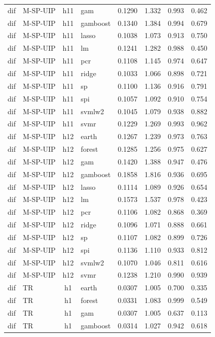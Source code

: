 \begin{ThreePartTable}
\begin{longtable}[t]{llclcccc}
dif & M-SP-UIP & h11 & gam & 0.1290 & 1.332 & 0.993 & 0.462\\
dif & M-SP-UIP & h11 & gamboost & 0.1340 & 1.384 & 0.994 & 0.679\\
dif & M-SP-UIP & h11 & lasso & 0.1038 & 1.073 & 0.913 & 0.750\\
dif & M-SP-UIP & h11 & lm & 0.1241 & 1.282 & 0.988 & 0.450\\
dif & M-SP-UIP & h11 & pcr & 0.1108 & 1.145 & 0.974 & 0.647\\
dif & M-SP-UIP & h11 & ridge & 0.1033 & 1.066 & 0.898 & 0.721\\
dif & M-SP-UIP & h11 & sp & 0.1100 & 1.136 & 0.916 & 0.791\\
dif & M-SP-UIP & h11 & spi & 0.1057 & 1.092 & 0.910 & 0.754\\
dif & M-SP-UIP & h11 & svmlw2 & 0.1045 & 1.079 & 0.938 & 0.882\\
dif & M-SP-UIP & h11 & svmr & 0.1229 & 1.269 & 0.993 & 0.962\\
\addlinespace
dif & M-SP-UIP & h12 & earth & 0.1267 & 1.239 & 0.973 & 0.763\\
dif & M-SP-UIP & h12 & forest & 0.1285 & 1.256 & 0.975 & 0.627\\
dif & M-SP-UIP & h12 & gam & 0.1420 & 1.388 & 0.947 & 0.476\\
dif & M-SP-UIP & h12 & gamboost & 0.1858 & 1.816 & 0.936 & 0.695\\
dif & M-SP-UIP & h12 & lasso & 0.1114 & 1.089 & 0.926 & 0.654\\
dif & M-SP-UIP & h12 & lm & 0.1573 & 1.537 & 0.978 & 0.423\\
dif & M-SP-UIP & h12 & pcr & 0.1106 & 1.082 & 0.868 & 0.369\\
dif & M-SP-UIP & h12 & ridge & 0.1096 & 1.071 & 0.888 & 0.661\\
dif & M-SP-UIP & h12 & sp & 0.1107 & 1.082 & 0.899 & 0.726\\
dif & M-SP-UIP & h12 & spi & 0.1136 & 1.110 & 0.933 & 0.812\\
dif & M-SP-UIP & h12 & svmlw2 & 0.1070 & 1.046 & 0.811 & 0.616\\
dif & M-SP-UIP & h12 & svmr & 0.1238 & 1.210 & 0.990 & 0.939\\
\addlinespace
dif & TR & h1 & earth & 0.0307 & 1.005 & 0.700 & 0.335\\
dif & TR & h1 & forest & 0.0331 & 1.083 & 0.999 & 0.549\\
dif & TR & h1 & gam & 0.0307 & 1.005 & 0.637 & 0.113\\
dif & TR & h1 & gamboost & 0.0314 & 1.027 & 0.942 & 0.618\\

\end{longtable}
\end{ThreePartTable}
